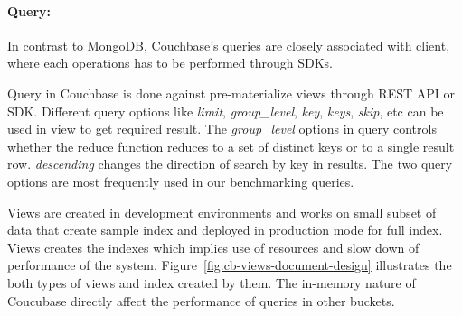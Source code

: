 \paragraph{Query:}
 In contrast to MongoDB,  Couchbase's queries are closely associated with client,  where each operations has to be performed through SDKs.
\par
 Query in Couchbase is done against pre-materialize views through REST API or SDK. Different query options like \textit{limit}, \textit{group\_level}, \textit{key}, \textit{keys}, \textit{skip}, etc can be used in view to get required result. The \textit{group\_level} options in query controls whether the reduce function reduces to a set of distinct keys or to a single result row.  \textit{descending} changes the direction of search by key in results. The two query options are most frequently used in our benchmarking queries.
\par 
Views are created in development environments and works on small subset of data that create sample index and deployed in production mode for full index. Views creates the indexes which implies use of resources and slow down of performance of the system. Figure~\ref{fig:cb-views-document-design} illustrates the both types of views and index created by them. The in-memory nature of Coucubase directly affect the performance of queries in other buckets.
	
 
 
 
 
 
 
 
 
 
 
 
 
 
 
 
 
 
 
 
 
 
 

	